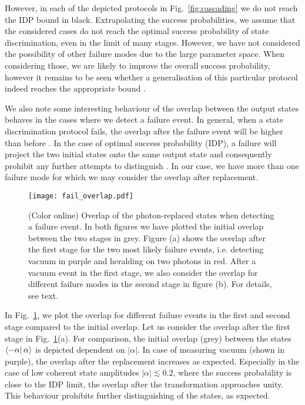 \documentclass[aps,prl,twocolumn, superscriptaddress]{revtex4-1}
\begin{document}
However, in each of the depicted protocols in Fig.~\ref{fig:cascading} we do not reach the IDP bound in black. Extrapolating the success probabilities, we assume that the considered cases do not reach the optimal success probability of state discrimination, even in the limit of many stages. However, we have not considered the possibility of other failure modes due to the large parameter space. When considering those, we are likely to improve the overall success probability, however it remains to be seen whether a generalisation of this particular protocol indeed reaches the appropriate bound \cite{dieks_overlap_1988}. 

We also note some interesting behaviour of the overlap between the output states behaves in the cases where we detect a failure event. In general, when a state discrimination protocol fails, the overlap after the failure event will be higher than before \cite{ivanovic_how_1987, chefles_quantum_2000}. In the case of optimal success probability (IDP), a failure will project the two initial states onto the same output state and consequently prohibit any further attempts to distinguish \cite{dieks_overlap_1988, peres_how_1988}. In our case, we have more than one failure mode for which we may consider the overlap after replacement.
%
\begin{figure}
\texttt{[image: fail\_overlap.pdf]}
\caption{(Color online) Overlap of the photon-replaced states when detecting a failure event. In both figures we have plotted the initial overlap between the two stages in grey. Figure (a) shows the overlap after the first stage for the two most likely failure events, i.e. detecting vacuum in purple and heralding on two photons in red. After a vacuum event in the first stage, we also consider the overlap for different failure modes in the second stage in figure (b). For details, see text.}
\label{fig:fail_overlap}
\end{figure}
%
In Fig.~\ref{fig:fail_overlap}, we plot the overlap for different failure events in the first and second stage compared to the initial overlap. Let us consider the overlap after the first stage in Fig.~\ref{fig:fail_overlap}(a). For comparison, the initial overlap (grey) between the states $\bra{-\alpha}\alpha\rangle$ is depicted dependent on $|\alpha|$. In case of measuring vacuum (shown in purple), the overlap after the replacement increases as expected. Especially in the case of low coherent state amplitudes $|\alpha|\lesssim 0.2$, where the success probability is close to the IDP limit, the overlap after the transformation approaches unity. This behaviour prohibits further distinguishing of the states, as expected.
\end{document}
